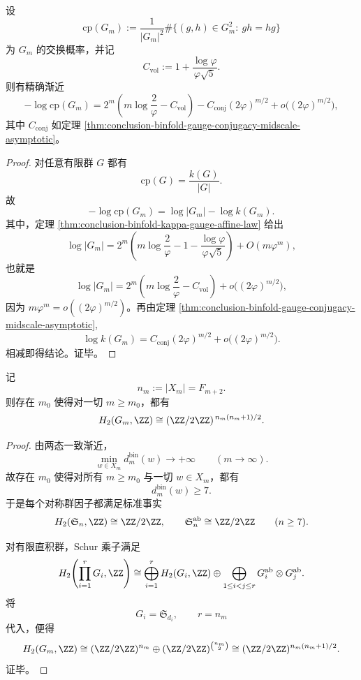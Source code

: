 \begin{theorem}[规范群交换概率的超指数非阿贝尔律]\label{thm:conclusion-binfold-gauge-commuting-probability-superexponential}
设
\[
\mathrm{cp}(G_m):=
\frac{1}{|G_m|^2}\#\{(g,h)\in G_m^2:\ gh=hg\}
\]
为 \(G_m\) 的交换概率，并记
\[
C_{\mathrm{vol}}:=1+\frac{\log\varphi}{\varphi\sqrt5}.
\]
则有精确渐近
\[
-\log \mathrm{cp}(G_m)
=
2^m\left(m\log\frac{2}{\varphi}-C_{\mathrm{vol}}\right)
-C_{\mathrm{conj}}(2\varphi)^{m/2}
+o\!\bigl((2\varphi)^{m/2}\bigr),
\]
其中 \(C_{\mathrm{conj}}\) 如定理 \ref{thm:conclusion-binfold-gauge-conjugacy-midscale-asymptotic}。
\end{theorem}
\begin{proof}
对任意有限群 \(G\) 都有
\[
\mathrm{cp}(G)=\frac{k(G)}{|G|}.
\]
故
\[
-\log \mathrm{cp}(G_m)=\log |G_m|-\log k(G_m).
\]
其中，定理 \ref{thm:conclusion-binfold-kappa-gauge-affine-law} 给出
\[
\log |G_m|
=
2^m\left(
m\log\frac{2}{\varphi}
-1-\frac{\log\varphi}{\varphi\sqrt5}
\right)
+O(m\varphi^m),
\]
也就是
\[
\log |G_m|
=
2^m\left(m\log\frac{2}{\varphi}-C_{\mathrm{vol}}\right)
+o\!\bigl((2\varphi)^{m/2}\bigr),
\]
因为 \(m\varphi^m=o((2\varphi)^{m/2})\)。再由定理 \ref{thm:conclusion-binfold-gauge-conjugacy-midscale-asymptotic},
\[
\log k(G_m)
=
C_{\mathrm{conj}}(2\varphi)^{m/2}
+o\!\bigl((2\varphi)^{m/2}\bigr).
\]
相减即得结论。证毕。
\end{proof}

\begin{theorem}\label{thm:conclusion-binfold-gauge-schur-multiplier-quadratic-explosion}
记
\[
n_m:=|X_m|=F_{m+2}.
\]
则存在 \(m_0\) 使得对一切 \(m\ge m_0\)，都有
\[
H_2(G_m,\ZZ)\cong (\ZZ/2\ZZ)^{\,n_m(n_m+1)/2}.
\]
\end{theorem}
\begin{proof}
由两态一致渐近，
\[
\min_{w\in X_m}d_m^{\mathrm{bin}}(w)\longrightarrow+\infty
\qquad(m\to\infty).
\]
故存在 \(m_0\) 使得对所有 \(m\ge m_0\) 与一切 \(w\in X_m\)，都有
\[
d_m^{\mathrm{bin}}(w)\ge 7.
\]
于是每个对称群因子都满足标准事实
\[
H_2(\mathfrak S_n,\ZZ)\cong \ZZ/2\ZZ,
\qquad
\mathfrak S_n^{\mathrm{ab}}\cong \ZZ/2\ZZ
\qquad(n\ge 7).
\]

对有限直积群，Schur 乘子满足
\[
H_2\!\left(\prod_{i=1}^r G_i,\ZZ\right)
\cong
\bigoplus_{i=1}^r H_2(G_i,\ZZ)
\oplus
\bigoplus_{1\le i<j\le r} G_i^{\mathrm{ab}}\otimes G_j^{\mathrm{ab}}.
\]
将
\[
G_i=\mathfrak S_{d_i},
\qquad
r=n_m
\]
代入，便得
\[
H_2(G_m,\ZZ)
\cong
(\ZZ/2\ZZ)^{n_m}
\oplus
(\ZZ/2\ZZ)^{\binom{n_m}{2}}
\cong
(\ZZ/2\ZZ)^{n_m(n_m+1)/2}.
\]
证毕。
\end{proof}

